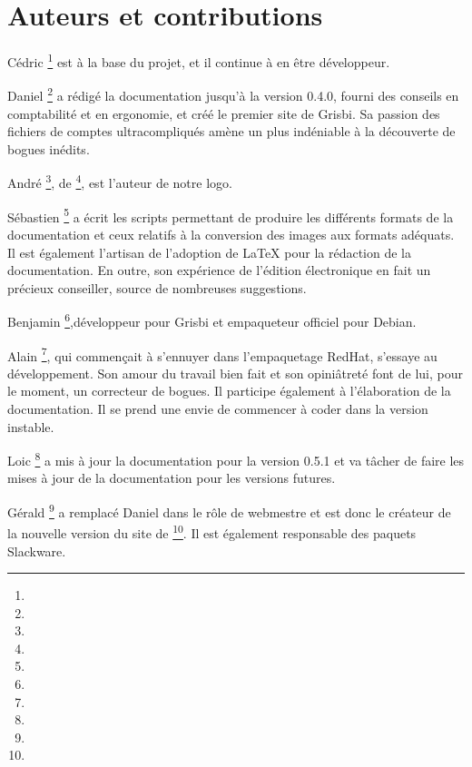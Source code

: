 \section{Auteurs et contributions\label{introduction-authors}}


{Cédric }\footnote{\urlCedricAugerEmail{}} est à la base du projet, et il continue à en être développeur.

{Daniel }\footnote{\urlDanielCartronEmail{}} a rédigé la documentation jusqu'à la version 0.4.0, fourni des conseils en comptabilité
et en ergonomie, et créé le premier site de Grisbi. Sa passion des fichiers de
comptes ultracompliqués amène un plus indéniable à la découverte de bogues inédits.

{André }\footnote{\urlAndrePascualEmail{}}, de
\footnote{\urlLinuxGraphic{}}, est l'auteur de notre logo.

{Sébastien }\footnote{\urlSebastienBlondeelEmail{}} a écrit les scripts permettant de produire les différents formats de la documentation et ceux relatifs à la conversion des images aux formats adéquats. Il est également l'artisan de l'adoption de \gls{LaTeX} pour la rédaction de la documentation. En outre, son expérience de l'édition électronique en fait un précieux conseiller, source de nombreuses suggestions.

{Benjamin }\footnote{\urlBenjaminDrieuEmail{}},développeur pour Grisbi et empaqueteur officiel pour \gls{Debian}.

{Alain }\footnote{\urlDionysosEmail{}}, qui commençait à s'ennuyer dans l'empaquetage \gls{RedHat}, s'essaye au développement. Son amour du travail bien fait et son opiniâtreté font de lui, pour le moment, un correcteur de bogues. Il participe également à l'élaboration de la documentation. Il se prend une envie de commencer à coder dans la version instable.

{Loic \footnote{\urlLoicBreillouxEmail{}}} a mis à jour la documentation pour la version 0.5.1 et va tâcher de faire les mises à jour de la documentation pour les versions futures.

{Gérald }\footnote{\urlGeraldNielEmail{}} a remplacé
{Daniel } dans le rôle de webmestre et est donc le créateur de la nouvelle version du site de \footnote{\urlGrisbi{}}. Il est
également responsable des paquets \gls{Slackware}.

